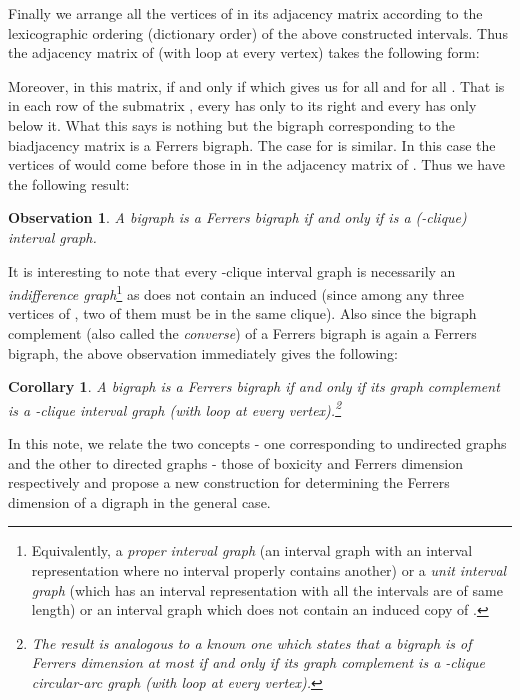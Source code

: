 \documentclass[11pt]{article}
\newtheorem{cor}[thm]{Corollary}
\newtheorem{obs}[thm]{Observation}
\theoremstyle{definition}
\theoremstyle{remark}
\numberwithin{equation}{section}
\begin{document}
\vspace{1em} Finally we arrange all the vertices of  in its adjacency matrix according to the lexicographic ordering (dictionary order) of the above constructed intervals. Thus the adjacency matrix of  (with loop at every vertex) takes the following form:

Moreover, in this matrix,  if and only if  which gives us  for all  and  for all . That is in each row of the submatrix , every  has only  to its right and every  has only  below it. What this says is nothing but the bigraph corresponding to the biadjacency matrix  is a Ferrers bigraph. The case for  is similar. In this case the vertices of  would come before those in  in the adjacency matrix of . Thus we have the following result:

\begin{obs}\label{t:fchar}
A bigraph  is a Ferrers bigraph if and only if  is a (-clique) interval graph.
\end{obs}

It is interesting to note that every -clique interval graph  is necessarily an {\em indifference graph}\footnote{Equivalently, a {\em proper interval graph} (an interval graph with an interval representation where no interval properly contains another) or a {\em unit interval graph} (which has an interval representation with all the intervals are of same length) or an interval graph which does not contain an induced copy of .} as  does not contain an induced  (since among any three vertices of , two of them must be in the same clique). 
Also since the bigraph complement (also called the {\em converse}) of a Ferrers bigraph is again a Ferrers bigraph, the above observation immediately gives the following:

\begin{cor}\label{c:fcomp}
A bigraph  is a Ferrers bigraph if and only if its graph complement is a -clique interval graph (with loop at every vertex).\footnote{The result is analogous to a known one which states that a bigraph  is of Ferrers dimension at most  if and only if its graph complement is a -clique circular-arc graph (with loop at every vertex).}
\end{cor}

In this note, we relate the two concepts - one corresponding to undirected graphs and the other to directed graphs - those of boxicity and Ferrers dimension respectively and propose a new construction for determining the Ferrers dimension of a digraph in the general case.
\end{document}
